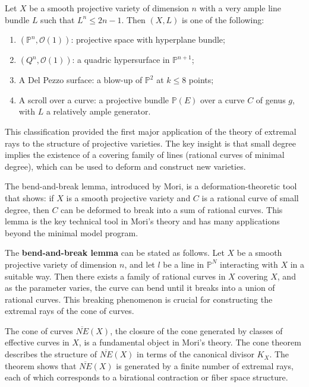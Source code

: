 \begin{theorem}
Let $X$ be a smooth projective variety of dimension $n$ with a very ample
line bundle $L$ such that $L^n \leq 2n - 1$. Then $(X, L)$ is one of the
following:
\begin{enumerate}
    \item $(\mathbb{P}^n, \mathcal{O}(1))$: projective space with hyperplane bundle;
    \item $(Q^n, \mathcal{O}(1))$: a quadric hypersurface in $\mathbb{P}^{n+1}$;
    \item A Del Pezzo surface: a blow-up of $\mathbb{P}^2$ at $k \leq 8$ points;
    \item A scroll over a curve: a projective bundle $\mathbb{P}(E)$ over a curve $C$
    of genus $g$, with $L$ a relatively ample generator.
\end{enumerate}
\end{theorem}

This classification provided the first major application of the theory of
extremal rays to the structure of projective varieties. The key insight is that
small degree implies the existence of a covering family of lines (rational curves
of minimal degree), which can be used to deform and construct new varieties.

The bend-and-break lemma, introduced by Mori, is a deformation-theoretic tool
that shows: if $X$ is a smooth projective variety and $C$ is a rational curve
of small degree, then $C$ can be deformed to break into a sum of rational curves.
This lemma is the key technical tool in Mori's theory and has many applications
beyond the minimal model program.

The \textbf{bend-and-break lemma} can be stated as follows. Let $X$ be a smooth
projective variety of dimension $n$, and let $l$ be a line in $\mathbb{P}^N$
interacting with $X$ in a suitable way. Then there exists a family of rational
curves in $X$ covering $X$, and as the parameter varies, the curve can bend
until it breaks into a union of rational curves. This breaking phenomenon is
crucial for constructing the extremal rays of the cone of curves.

The cone of curves $\overline{NE}(X)$, the closure of the cone generated by
classes of effective curves in $X$, is a fundamental object in Mori's theory.
The cone theorem describes the structure of $\overline{NE}(X)$ in terms of the
canonical divisor $K_X$. The theorem shows that $\overline{NE}(X)$ is generated
by a finite number of extremal rays, each of which corresponds to a birational
contraction or fiber space structure.

